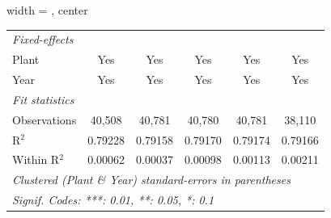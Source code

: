\begin{adjustbox}{width = \textwidth, center}
\begin{tabular}{lccccc}
      \midrule
      \emph{Fixed-effects}\\
      Plant                                 & Yes           & Yes      & Yes      & Yes      & Yes\\  
      Year                                  & Yes           & Yes      & Yes      & Yes      & Yes\\  
      \midrule
      \emph{Fit statistics}\\
      Observations                          & 40,508        & 40,781   & 40,780   & 40,781   & 38,110\\  
      R$^2$                                 & 0.79228       & 0.79158  & 0.79170  & 0.79174  & 0.79166\\  
      Within R$^2$                          & 0.00062       & 0.00037  & 0.00098  & 0.00113  & 0.00211\\  
      \midrule \midrule
      \multicolumn{6}{l}{\emph{Clustered (Plant \& Year) standard-errors in parentheses}}\\
      \multicolumn{6}{l}{\emph{Signif. Codes: ***: 0.01, **: 0.05, *: 0.1}}\\
   \end{tabular}
\end{adjustbox}
\par\endgroup


